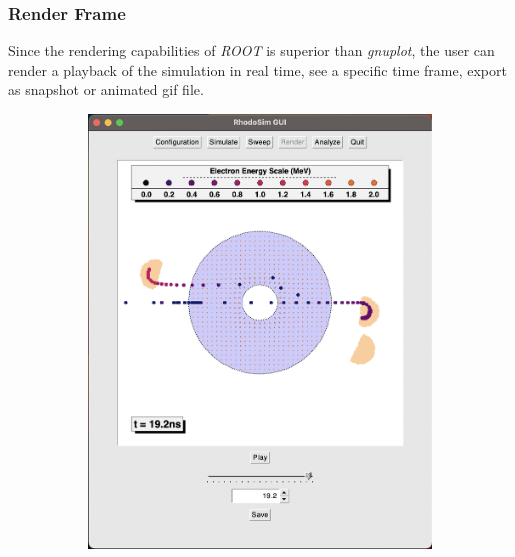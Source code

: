 \documentclass[a4paper,oneside,12pt]{report}
\numberwithin{equation}{chapter}
\begin{document}
\subsubsection{Render Frame}
Since the rendering capabilities of \textit{ROOT} is superior than \textit{gnuplot}, the user can render a playback of the simulation in real time, 
see a specific time frame, export as snapshot or animated gif file.

\begin{figure}
    \centering
    \captionsetup{justification=centering}
    \begin{subfigure}{0.8\textwidth}
        \centering
        \includegraphics[width=\linewidth]{./figures/rhodoSim/GUI_render_frame_1.png}
    \end{subfigure} 
    \begin{subfigure}{0.8\textwidth}
        \centering

\end{subfigure}
\end{figure}
\end{document}
